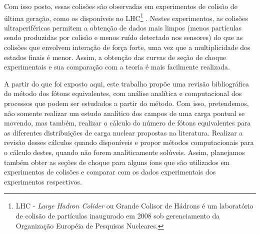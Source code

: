 Com isso posto, essas colisões são observadas em experimentos de colisão de
última geração, como os disponíveis no LHC\footnote{LHC - \textit{Large Hadron
Colider} ou Grande Colisor de Hádrons é um laboratório de colisão de partículas
inaugurado em 2008 sob gerenciamento da Organização Européia de Pesquisas
Nucleares.} \cite{BALTZ20081}. Nestes experimentos, as colisões
ultraperiféricas permitem a obtenção de dados mais limpos (menos partículas
sendo produzidas por colisão e menos ruído detectado nos sensores) do que as
colisões que envolvem interação de força forte, uma vez que a multiplicidade
dos estados finais é menor. Assim, a obtenção das curvas de seção de choque
experimentais e sua comparação com a teoria é mais facilmente realizada.

A partir do que foi exposto aqui, este trabalho propõe uma revisão
bibliográfica do método dos fótons equivalentes, com análise analítica e
computacional dos processos que podem ser estudados a partir do método. Com
isso, pretendemos, não somente realizar um estudo analítico dos campos de uma
carga pontual se movendo, mas também, realizar o cálculo do número de fótons
equivalentes para as diferentes distribuições de carga nuclear propostas na
literatura. Realizar a revisão desses cálculos quando disponíveis e propor
métodos computacionais para o cálculo destes, quando não forem analiticamente
solúveis. Assim, planejamos também obter as seções de choque para alguns íons
que são utilizados em experimentos de colisões e comparar com os dados
experimentais dos experimentos respectivos.




